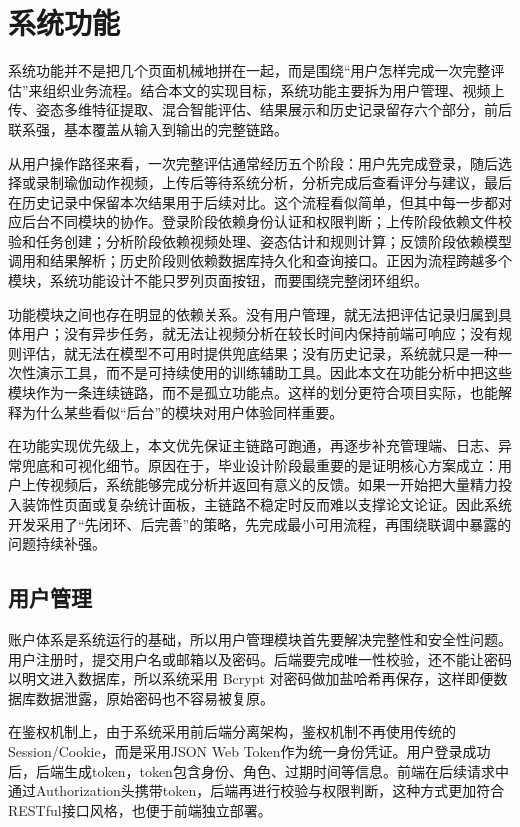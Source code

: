 \section{系统功能}

系统功能并不是把几个页面机械地拼在一起，而是围绕“用户怎样完成一次完整评估”来组织业务流程。结合本文的实现目标，系统功能主要拆为用户管理、视频上传、姿态多维特征提取、混合智能评估、结果展示和历史记录留存六个部分，前后联系强，基本覆盖从输入到输出的完整链路。

从用户操作路径来看，一次完整评估通常经历五个阶段：用户先完成登录，随后选择或录制瑜伽动作视频，上传后等待系统分析，分析完成后查看评分与建议，最后在历史记录中保留本次结果用于后续对比。这个流程看似简单，但其中每一步都对应后台不同模块的协作。登录阶段依赖身份认证和权限判断；上传阶段依赖文件校验和任务创建；分析阶段依赖视频处理、姿态估计和规则计算；反馈阶段依赖模型调用和结果解析；历史阶段则依赖数据库持久化和查询接口。正因为流程跨越多个模块，系统功能设计不能只罗列页面按钮，而要围绕完整闭环组织。

功能模块之间也存在明显的依赖关系。没有用户管理，就无法把评估记录归属到具体用户；没有异步任务，就无法让视频分析在较长时间内保持前端可响应；没有规则评估，就无法在模型不可用时提供兜底结果；没有历史记录，系统就只是一种一次性演示工具，而不是可持续使用的训练辅助工具。因此本文在功能分析中把这些模块作为一条连续链路，而不是孤立功能点。这样的划分更符合项目实际，也能解释为什么某些看似“后台”的模块对用户体验同样重要。

在功能实现优先级上，本文优先保证主链路可跑通，再逐步补充管理端、日志、异常兜底和可视化细节。原因在于，毕业设计阶段最重要的是证明核心方案成立：用户上传视频后，系统能够完成分析并返回有意义的反馈。如果一开始把大量精力投入装饰性页面或复杂统计面板，主链路不稳定时反而难以支撑论文论证。因此系统开发采用了“先闭环、后完善”的策略，先完成最小可用流程，再围绕联调中暴露的问题持续补强。

\subsection{用户管理}
账户体系是系统运行的基础，所以用户管理模块首先要解决完整性和安全性问题。用户注册时，提交用户名或邮箱以及密码。后端要完成唯一性校验，还不能让密码以明文进入数据库，所以系统采用 Bcrypt 对密码做加盐哈希再保存，这样即便数据库数据泄露，原始密码也不容易被复原。

在鉴权机制上，由于系统采用前后端分离架构，鉴权机制不再使用传统的Session/Cookie，而是采用JSON Web Token作为统一身份凭证。用户登录成功后，后端生成token，token包含身份、角色、过期时间等信息。前端在后续请求中通过Authorization头携带token，后端再进行校验与权限判断，这种方式更加符合RESTful接口风格，也便于前端独立部署。

